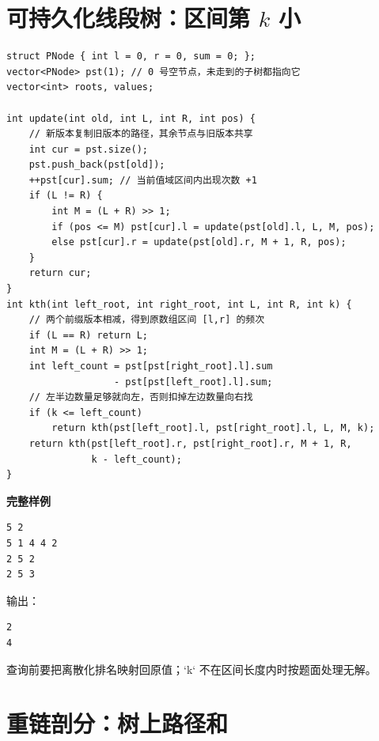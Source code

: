 \section{可持久化线段树：区间第 \(k\) 小}


\begin{lstlisting}[style=cpp]
struct PNode { int l = 0, r = 0, sum = 0; };
vector<PNode> pst(1); // 0 号空节点，未走到的子树都指向它
vector<int> roots, values;

int update(int old, int L, int R, int pos) {
    // 新版本复制旧版本的路径，其余节点与旧版本共享
    int cur = pst.size();
    pst.push_back(pst[old]);
    ++pst[cur].sum; // 当前值域区间内出现次数 +1
    if (L != R) {
        int M = (L + R) >> 1;
        if (pos <= M) pst[cur].l = update(pst[old].l, L, M, pos);
        else pst[cur].r = update(pst[old].r, M + 1, R, pos);
    }
    return cur;
}
int kth(int left_root, int right_root, int L, int R, int k) {
    // 两个前缀版本相减，得到原数组区间 [l,r] 的频次
    if (L == R) return L;
    int M = (L + R) >> 1;
    int left_count = pst[pst[right_root].l].sum
                   - pst[pst[left_root].l].sum;
    // 左半边数量足够就向左，否则扣掉左边数量向右找
    if (k <= left_count)
        return kth(pst[left_root].l, pst[right_root].l, L, M, k);
    return kth(pst[left_root].r, pst[right_root].r, M + 1, R,
               k - left_count);
}
\end{lstlisting}

\begin{card}
\textbf{完整样例}\\
\begin{lstlisting}
5 2
5 1 4 4 2
2 5 2
2 5 3
\end{lstlisting}
输出：
\begin{lstlisting}
2
4
\end{lstlisting}
查询前要把离散化排名映射回原值；`k` 不在区间长度内时按题面处理无解。
\end{card}

\section{重链剖分：树上路径和}


